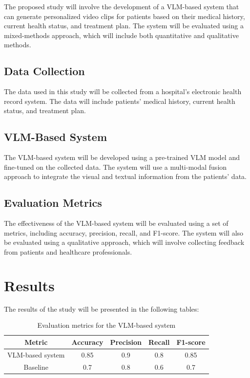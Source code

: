 \documentclass[12pt]{article}
\begin{document}
The proposed study will involve the development of a VLM-based system that can generate personalized video clips for patients based on their medical history, current health status, and treatment plan. The system will be evaluated using a mixed-methods approach, which will include both quantitative and qualitative methods.

\subsection{Data Collection}

The data used in this study will be collected from a hospital's electronic health record system. The data will include patients' medical history, current health status, and treatment plan.

\subsection{VLM-Based System}

The VLM-based system will be developed using a pre-trained VLM model and fine-tuned on the collected data. The system will use a multi-modal fusion approach to integrate the visual and textual information from the patients' data.

\subsection{Evaluation Metrics}

The effectiveness of the VLM-based system will be evaluated using a set of metrics, including accuracy, precision, recall, and F1-score. The system will also be evaluated using a qualitative approach, which will involve collecting feedback from patients and healthcare professionals.

\section{Results}

The results of the study will be presented in the following tables:

\begin{table}[h]
\centering
\begin{tabular}{|c|c|c|c|c|}
\hline
Metric & Accuracy & Precision & Recall & F1-score \\
\hline
VLM-based system & 0.85 & 0.9 & 0.8 & 0.85 \\
\hline
 Baseline & 0.7 & 0.8 & 0.6 & 0.7 \\
\hline
\end{tabular}
\caption{Evaluation metrics for the VLM-based system}
\end{table}
\end{document}
